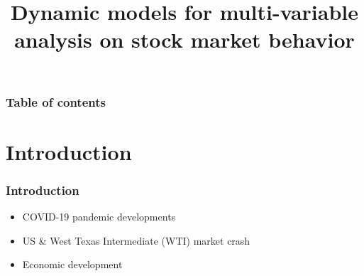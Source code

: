 \documentclass[aspectratio=169,classic]{uva-inf-presentation}
\title{Dynamic models for multi-variable analysis on stock market behavior}
\begin{document}
\begin{titelframe}
\titlepage
\end{titelframe}

\begin{titelframe}
\frametitle{Table of contents}
\tableofcontents
\end{titelframe}





\section{Introduction}
\begin{frame}
\frametitle{Introduction}
\begin{itemize}
    \item COVID-19 pandemic developments
    \item US \& West Texas Intermediate (WTI) market crash
    \item Economic development
\end{itemize}
\end{frame}

\twocolumn
\end{document}
